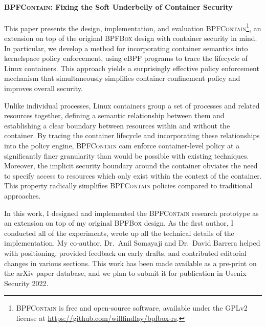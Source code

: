 \paragraph*{\textsc{BPFContain}: Fixing the Soft Underbelly of Container Security}
This paper presents the design, implementation, and evaluation
\textsc{BPFContain}\footnote{\textsc{BPFContain} is free and open-source software,
available under the GPLv2 license at \url{https://github.com/willfindlay/bpfbox-rs}.}, an
extension on top of the original \textsc{BPFBox} design with container security in mind.
In particular, we develop a method for incorporating container semantics into kernelspace
policy enforcement, using eBPF programs to trace the lifecycle of Linux containers. This
approach yields a surprisingly effective policy enforcement mechanism that simultaneously
simplifies container confinement policy and improves overall security.

Unlike individual processes, Linux containers group a set of processes and related
resources together, defining a semantic relationship between them and establishing a clear
boundary between resources within and without the container. By tracing the
container lifecycle and incorporating these relationships into the policy engine,
\textsc{BPFContain} cam enforce container-level policy at a significantly finer
granularity than would be possible with existing techniques. Moreover, the implicit
security boundary around the container obviates the need to specify access to resources
which only exist within the context of the container. This property radically simplifies
\textsc{BPFContain} policies compared to traditional approaches.

In this work, I designed and implemented the \textsc{BPFContain} research prototype as an
extension on top of my original \textsc{BPFBox} design. As the first author, I conducted all
of the experiments, wrote up all the technical details of the implementation. My
co-author, Dr.\ Anil Somayaji and Dr.\ David Barrera helped with positioning, provided
feedback on early drafts, and contributed editorial changes in various sections.
This work has been made available as a pre-print on the arXiv paper database, and we
plan to submit it for publication in Usenix Security 2022.



